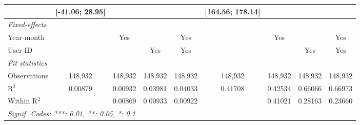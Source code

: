 \begin{table}[htbp]
\begin{threeparttable}[b]
\begin{tabular}{lcccccccc}
                         & [-41.06; 28.95] &                 &                &                 & [164.56; 178.14] &                 &                &   \\   
         \midrule
         \emph{Fixed-effects}\\
         Year-month      &                 & Yes             &                & Yes             &                  & Yes             &                & Yes\\  
         User ID         &                 &                 & Yes            & Yes             &                  &                 & Yes            & Yes\\  
         \midrule
         \emph{Fit statistics}\\
         Observations    & 148,932         & 148,932         & 148,932        & 148,932         & 148,932          & 148,932         & 148,932        & 148,932\\  
         R$^2$           & 0.00879         & 0.00932         & 0.03981        & 0.04033         & 0.41708          & 0.42534         & 0.66066        & 0.66973\\  
         Within R$^2$    &                 & 0.00869         & 0.00933        & 0.00922         &                  & 0.41021         & 0.28163        & 0.23660\\  
         \midrule \midrule
         \multicolumn{9}{l}{\emph{Signif. Codes: ***: 0.01, **: 0.05, *: 0.1}}\\
      \end{tabular}
   \end{threeparttable}
\end{table}


